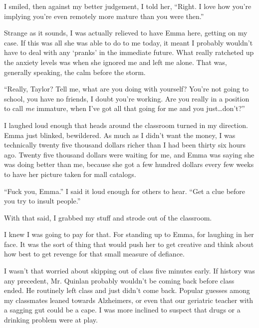 I smiled, then against my better judgement, I told her, ``Right.  I love how you're implying you're even remotely more mature than you were then.''



Strange as it sounds, I was actually relieved to have Emma here, getting on my case.  If this was all she was able to do to me today, it meant I probably wouldn't have to deal with any `pranks' in the immediate future.  What really ratcheted up the anxiety levels was when she ignored me and left me alone.  That was, generally speaking, the calm before the storm.



``Really, Taylor?  Tell me, what are you doing with yourself?  You're not going to school, you have no friends, I doubt you're working.  Are you really in a position to call \emph{me} immature, when I've got all that going for me and you just\ldots don't?''



I laughed loud enough that heads around the classroom turned in my direction.  Emma just blinked, bewildered.  As much as I didn't want the money,  I was technically twenty five thousand dollars richer than I had been thirty six hours ago.  Twenty five thousand dollars were waiting for me, and Emma was saying she was doing better than me, because she got a few hundred dollars every few weeks to have her picture taken for mall catalogs.



``Fuck you, Emma.''  I said it loud enough for others to hear.  ``Get a clue before you try to insult people.''



With that said, I grabbed my stuff and strode out of the classroom.



I knew I was going to pay for that.  For standing up to Emma, for laughing in her face.  It was the sort of thing that would push her to get creative and think about how best to get revenge for that small measure of defiance.



I wasn't that worried about skipping out of class five minutes early.  If history was any precedent, Mr. Quinlan probably wouldn't be coming back before class ended.  He routinely left class and just didn't come back.  Popular guesses among my classmates leaned towards Alzheimers, or even that our geriatric teacher with a sagging gut could be a cape.  I was more inclined to suspect that drugs or a drinking problem were at play.



